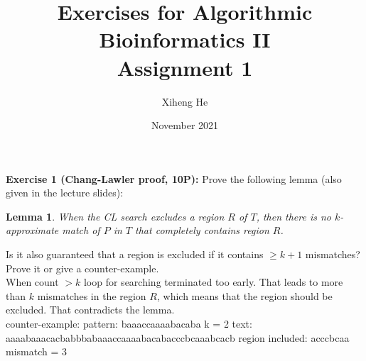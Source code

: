 \documentclass{article}
\title{Exercises for Algorithmic Bioinformatics II\\
Assignment 1}
\author{Xiheng He}
\date{November 2021}
\newtheorem*{lemma}{Lemma}
\begin{document}
{\let\newpage\relax\maketitle}
\begin{flushleft}
\textbf{Exercise 1 (Chang-Lawler proof, 10P):}
\newline
Prove the following lemma (also given in the lecture slides):
\begin{lemma}
    \normalfont
    When the CL search excludes a region $R$ of $T$, then there is no $k$-approximate match of
    $P$ in $T$ that completely contains region $R$.
\end{lemma}
Is it also guaranteed that a region is excluded if it contains $\geq  k + 1$ mismatches?
Prove it or give a counter-example.
\newline \\
When count $> k$ loop for searching terminated too early. That leads to more than $k$ mismatches in the region $R$,
which means that the region should be excluded. That contradicts the lemma.
\newline \\
counter-example:
\newline
pattern: baaaccaaaabacaba
\newline
k = 2
\newline
text: aaaabaaacacbabbbabaaaccaaaabacabacccbcaaabcacb
\newline
region included: acccbcaa
\newline
mismatch = 3
\end{flushleft}
\end{document}
